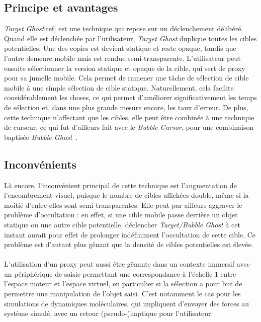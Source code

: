 	\subsection{Principe et avantages}
	\emph{Target Ghost}[ref] est une technique qui repose sur un déclenchement délibéré. Quand elle est déclenchée par l'utilisateur, \emph{Target Ghost} duplique toutes les cibles potentielles. Une des copies est devient statique et reste opaque, tandis que l'autre demeure mobile mais est rendue semi-transparente. L'utilisateur peut ensuite sélectionner la version statique et opaque de la cible, qui sert de proxy pour sa jumelle mobile. Cela permet de ramener une tâche de sélection de cible mobile à une simple sélection de cible statique. Naturellement, cela facilite considérablement les choses, ce qui permet d'améliorer significativement les temps de sélection et, dans une plus grande mesure encore, les taux d'erreur. De plus, cette technique n'affectant que les cibles, elle peut être combinée à une technique de curseur, ce qui fut d'ailleurs fait avec le \emph{Bubble Cursor}, pour une combinaison baptisée \emph{Bubble Ghost}~\cite{hasan2011comet}.
		
	\subsection{Inconvénients}
	Là encore, l'inconvénient principal de cette technique est l'augmentation de l'encombrement visuel, puisque le nombre de cibles affichées double, même si la moitié d'entre elles sont semi-transparentes. Elle peut par ailleurs aggraver le problème d'occultation : en effet, si une cible mobile passe derrière un objet statique ou une autre cible potentielle, déclencher \emph{Target/Bubble Ghost} à cet instant aurait pour effet de prolonger indéfiniment l'occultation de cette cible. Ce problème est d'autant plus gênant que la densité de cibles potentielles est élevée.
		
	\paragraph{}
	L'utilisation d'un proxy peut aussi être gênante dans un contexte immersif avec un périphérique de saisie permettant une correspondance à l'échelle $1$ entre l'espace moteur et l'espace virtuel, en particulier si la sélection a pour but de permettre une manipulation de l'objet saisi. C'est notamment le cas pour les simulations de dynamiques moléculaires, qui impliquent d'envoyer des forces au système simulé, avec un retour (pseudo-)haptique pour l'utilisateur.
		

